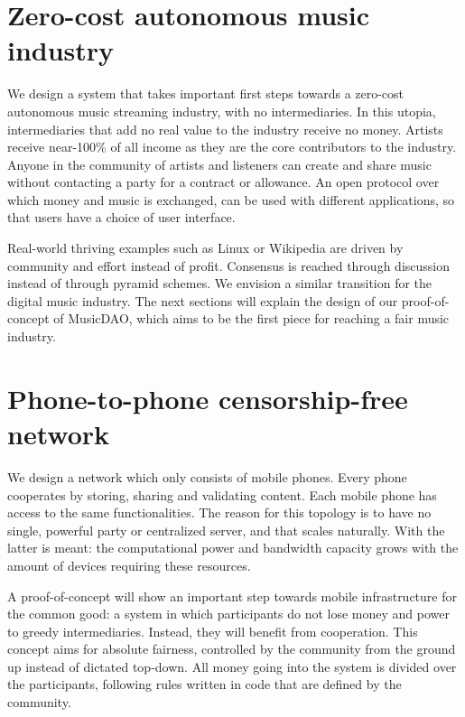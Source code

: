 \section{Zero-cost autonomous music industry}
We design a system that takes important first steps towards a zero-cost autonomous music streaming industry, with no intermediaries. In this utopia, intermediaries that add no real value to the industry receive no money. Artists receive near-100\% of all income as they are the core contributors to the industry. Anyone in the community of artists and listeners can create and share music without contacting a party for a contract or allowance. An open protocol over which money and music is exchanged, can be used with different applications, so that users have a choice of user interface. 

Real-world thriving examples such as Linux or Wikipedia are driven by community and effort instead of profit. Consensus is reached through discussion instead of through pyramid schemes. We envision a similar transition for the digital music industry. The next sections will explain the design of our proof-of-concept of MusicDAO, which aims to be the first piece for reaching a fair music industry.

\section{Phone-to-phone censorship-free network}
We design a network which only consists of mobile phones. Every phone cooperates by storing, sharing and validating content. Each mobile phone has access to the same functionalities. The reason for this topology is to have no single, powerful party or centralized server, and that scales naturally. With the latter is meant: the computational power and bandwidth capacity grows with the amount of devices requiring these resources.

A proof-of-concept will show an important step towards mobile infrastructure for the common good: a system in which participants do not lose money and power to greedy intermediaries. Instead, they will benefit from cooperation. This concept aims for absolute fairness, controlled by the community from the ground up instead of dictated top-down. All money going into the system is divided over the participants, following rules written in code that are defined by the community.

